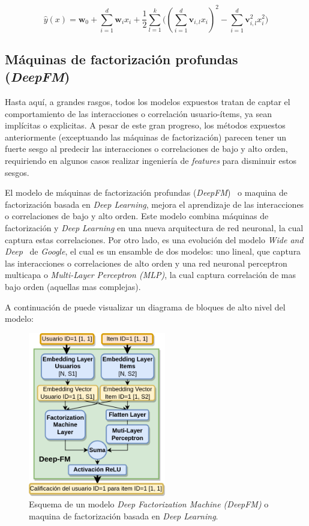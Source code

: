 \documentclass[11pt,a4paper,twoside]{thesis}
\begin{document}
\begin{equation}
	\hat{y}(x) = \mathbf{w}_0 + \sum_{i=1}^d \mathbf{w}_i x_i + \frac{1}{2} \sum_{l=1}^k \big ((\sum_{i=1}^d \mathbf{v}_{i, l} x_i)^2 - \sum_{i=1}^d \mathbf{v}_{i, l}^2 x_i^2)
\end{equation}

\clearpage

\subsection{Máquinas de factorización profundas (\textit{DeepFM})}

Hasta aquí, a grandes rasgos, todos los modelos expuestos tratan de captar el
comportamiento de las interacciones o correlación usuario-ítems, ya sean
implícitas o explicitas. A pesar de este gran progreso, los métodos expuestos
anteriormente (exceptuando las máquinas de factorización) parecen tener un
fuerte sesgo al predecir las interacciones o correlaciones de bajo y alto
orden, requiriendo en algunos casos realizar ingeniería de \textit{features}
para disminuir estos sesgos.

El modelo de máquinas de factorización profundas
(\textit{DeepFM})~\cite{dfmpaper, didldfm} o maquina de factorización basada en
\textit{Deep Learning}, mejora el aprendizaje de las interacciones o
correlaciones de bajo y alto orden. Este modelo combina máquinas de
factorización y \textit{Deep Learning} en una nueva arquitectura de red
neuronal, la cual captura estas correlaciones. Por otro lado, es una evolución
del modelo \textit{Wide and Deep}~\cite{wideanddeeppaper} de \textit{Google},
el cual es un ensamble de dos modelos: uno lineal, que captura las
interacciones o correlaciones de alto orden y una red neuronal perceptron
multicapa o \textit{Multi-Layer Perceptron (MLP)}, la cual captura correlación
de mas bajo orden (aquellas mas complejas).

A continuación de puede visualizar un diagrama de bloques de alto nivel del
modelo:

\begin{figure}[h!]
	\centering
	\includegraphics[width=6cm]{./images/Deep-MF.png}
	\caption{
		Esquema de un modelo \textit{Deep Factorization Machine (DeepFM)} o maquina
		de factorización basada en \textit{Deep Learning}.
	}
	\label{fig:DeepMFModel}
\end{figure}
\end{document}
